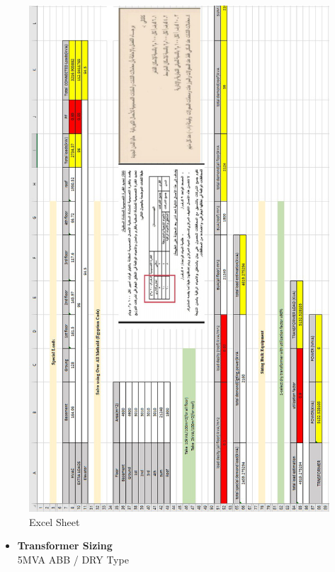 \documentclass[12pt,fleqn]{book} %
\begin{document}
\begin{figure}[!h]
    \centering
    \includegraphics[width=0.90\linewidth]{fikry 4.png}
    \caption{Excel Sheet}
    \label{fig:fikry 4}
\end{figure}
\begin{itemize}
\item \textbf {Transformer Sizing}
\\ { 5MVA } ABB / DRY Type
\end{itemize}



\end{document}
